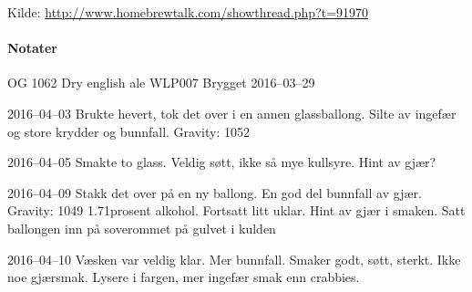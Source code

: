 \documentclass[12pt,a4paper]{book}
\begin{document}
Kilde: \url{http://www.homebrewtalk.com/showthread.php?t=91970}

\paragraph{Notater}

OG 1062
Dry english ale WLP007
Brygget 2016--03--29

2016--04--03
Brukte hevert, tok det over i en annen glassballong. Silte av ingefær og store krydder og bunnfall.
Gravity: 1052

2016--04--05
Smakte to glass. Veldig søtt, ikke så mye kullsyre. Hint av gjær?

2016--04--09
Stakk det over på en ny ballong. En god del bunnfall av gjær.
Gravity: 1049  1.71prosent alkohol.
Fortsatt litt uklar. Hint av gjær i smaken.
Satt ballongen inn på soverommet på gulvet i kulden

2016--04--10
Væsken var veldig klar. Mer bunnfall.
Smaker godt, søtt, sterkt. Ikke noe gjærsmak. Lysere i fargen, mer ingefær smak enn crabbies.
\clearpage{}
 
\printindex
\end{document}
